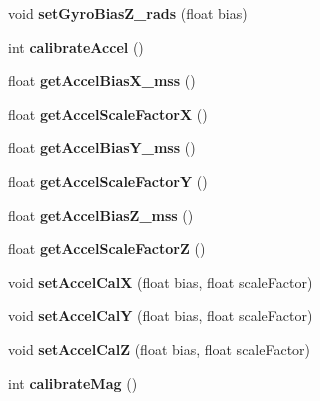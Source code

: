 \begin{DoxyCompactItemize}
void {\bfseries set\+Gyro\+Bias\+Z\+\_\+rads} (float bias)
\item 
\mbox{\label{class_m_p_u9250_ad5f4d08b299f35374d1bca9d7122fcdc}} 
int {\bfseries calibrate\+Accel} ()
\item 
\mbox{\label{class_m_p_u9250_ab1216d85d53de15fb1f8ddc1e4424318}} 
float {\bfseries get\+Accel\+Bias\+X\+\_\+mss} ()
\item 
\mbox{\label{class_m_p_u9250_a2664ab962bccde644ef528349e1660d6}} 
float {\bfseries get\+Accel\+Scale\+FactorX} ()
\item 
\mbox{\label{class_m_p_u9250_af02b9af589591792b6fe7328582e32ef}} 
float {\bfseries get\+Accel\+Bias\+Y\+\_\+mss} ()
\item 
\mbox{\label{class_m_p_u9250_ad9b6213723700af8daba00f31840fe16}} 
float {\bfseries get\+Accel\+Scale\+FactorY} ()
\item 
\mbox{\label{class_m_p_u9250_ab3421dae6ebe1190407be7a832b6313c}} 
float {\bfseries get\+Accel\+Bias\+Z\+\_\+mss} ()
\item 
\mbox{\label{class_m_p_u9250_a046579c4492296dce3d3a0cf2e409e96}} 
float {\bfseries get\+Accel\+Scale\+FactorZ} ()
\item 
\mbox{\label{class_m_p_u9250_acfc8adb5dcfe24eb35f2a82377c0d8a0}} 
void {\bfseries set\+Accel\+CalX} (float bias, float scale\+Factor)
\item 
\mbox{\label{class_m_p_u9250_aa56ca1f8a383ba760188f204a9ef6548}} 
void {\bfseries set\+Accel\+CalY} (float bias, float scale\+Factor)
\item 
\mbox{\label{class_m_p_u9250_a9ab03b06b0d01aa4f8588cd9fd6588c6}} 
void {\bfseries set\+Accel\+CalZ} (float bias, float scale\+Factor)
\item 
\mbox{\label{class_m_p_u9250_aba735458296fb277a05efcb1a3ceb761}} 
int {\bfseries calibrate\+Mag} ()
\item 

\end{DoxyCompactItemize}
